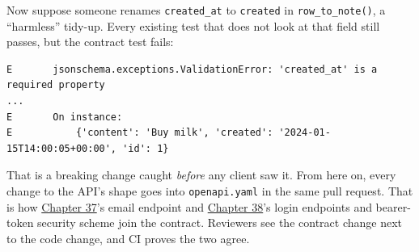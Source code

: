 \noindent{}Now suppose someone renames \texttt{created\_at} to \texttt{created} in \texttt{row\_to\_note()}, a ``harmless'' tidy-up. Every existing test that does not look at that field still passes, but the contract test fails:

\begin{outputbox}[short]
\begin{Verbatim}[fontsize=\codesize, breaklines, breakanywhere, breaksymbolleft={\tiny\textcolor{muted}{$\hookrightarrow$}}]
E       jsonschema.exceptions.ValidationError: 'created_at' is a required property
...
E       On instance:
E           {'content': 'Buy milk', 'created': '2024-01-15T14:00:05+00:00', 'id': 1}
\end{Verbatim}
\end{outputbox}

\noindent{}That is a breaking change caught \emph{before} any client saw it. From here on, every change to the API's shape goes into \texttt{openapi.yaml} in the same pull request. That is how \hyperref[ch:37-reliability]{Chapter 37}'s email endpoint and \hyperref[ch:38-security]{Chapter 38}'s login endpoints and bearer-token security scheme join the contract. Reviewers see the contract change next to the code change, and CI proves the two agree.

